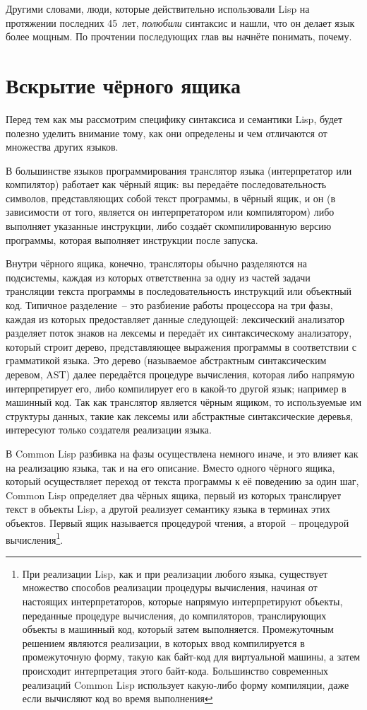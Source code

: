 Другими словами, люди, которые действительно использовали Lisp на протяжении последних
45~лет, \textit{полюбили} синтаксис и нашли, что он делает язык более мощным. По прочтении
последующих глав вы начнёте понимать, почему.

\section{Вскрытие чёрного ящика}

Перед тем как мы рассмотрим специфику синтаксиса и семантики Lisp, будет полезно уделить
внимание тому, как они определены и чем отличаются от множества других языков.

В большинстве языков программирования транслятор языка (интерпретатор или компилятор)
работает как чёрный ящик: вы передаёте последовательность символов, представляющих собой
текст программы, в чёрный ящик, и он (в зависимости от того, является он интерпретатором
или компилятором) либо выполняет указанные инструкции, либо создаёт скомпилированную
версию программы, которая выполняет инструкции после запуска.

Внутри чёрного ящика, конечно, трансляторы обычно разделяются на подсистемы, каждая из
которых ответственна за одну из частей задачи трансляции текста программы в
последовательность инструкций или объектный код. Типичное разделение~-- это разбиение
работы процессора на три фазы, каждая из которых предоставляет данные следующей:
лексический анализатор разделяет поток знаков на лексемы и передаёт их синтаксическому
анализатору, который строит дерево, представляющее выражения программы в соответствии с
грамматикой языка. Это дерево (называемое абстрактным синтаксическим деревом, AST) далее
передаётся процедуре вычисления, которая либо напрямую интерпретирует его, либо
компилирует его в какой-то другой язык; например в машинный код. Так как транслятор
является чёрным ящиком, то используемые им структуры данных, такие как лексемы или
абстрактные синтаксические деревья, интересуют только создателя реализации языка.

В Common Lisp разбивка на фазы осуществлена немного иначе, и это влияет как на реализацию
языка, так и на его описание. Вместо одного чёрного ящика, который осуществляет переход от
текста программы к её поведению за один шаг, Common Lisp определяет два чёрных ящика,
первый из которых транслирует текст в объекты Lisp, а другой реализует семантику языка в
терминах этих объектов. Первый ящик называется процедурой чтения, а второй~-- процедурой
вычисления\footnote{При реализации Lisp, как и при
  реализации любого языка, существует множество способов реализации процедуры вычисления,
  начиная от настоящих интерпретаторов, которые напрямую интерпретируют объекты,
  переданные процедуре вычисления, до компиляторов, транслирующих объекты в машинный код,
  который затем выполняется. Промежуточным решением являются реализации, в которых ввод
  компилируется в промежуточную форму, такую как байт-код для виртуальной машины, а затем
  происходит интерпретация этого байт-кода. Большинство современных реализаций Common Lisp
  использует какую-либо форму компиляции, даже если вычисляют код во время выполнения}.

